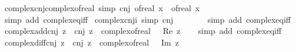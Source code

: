 \begin{isabellebody}
\endisatagproof
{\isafoldproof}%
%
\isadelimproof
\isanewline
%
\endisadelimproof
\isanewline
{}\isamarkupfalse%
\ complex{\isacharunderscore}{\kern0pt}cnj{\isacharunderscore}{\kern0pt}complex{\isacharunderscore}{\kern0pt}of{\isacharunderscore}{\kern0pt}real\ {\isacharbrackleft}{\kern0pt}simp{\isacharbrackright}{\kern0pt}{\isacharcolon}{\kern0pt}\ {\isachardoublequoteopen}cnj\ {\isacharparenleft}{\kern0pt}of{\isacharunderscore}{\kern0pt}real\ x{\isacharparenright}{\kern0pt}\ {\isacharequal}{\kern0pt}\ of{\isacharunderscore}{\kern0pt}real\ x{\isachardoublequoteclose}\isanewline
%
\isadelimproof
\ \ %
\endisadelimproof
%
\isatagproof
{}\isamarkupfalse%
\ {\isacharparenleft}{\kern0pt}simp\ add{\isacharcolon}{\kern0pt}\ complex{\isacharunderscore}{\kern0pt}eq{\isacharunderscore}{\kern0pt}iff{\isacharparenright}{\kern0pt}%
\endisatagproof
{\isafoldproof}%
%
\isadelimproof
\isanewline
%
\endisadelimproof
\isanewline
{}\isamarkupfalse%
\ complex{\isacharunderscore}{\kern0pt}cnj{\isacharunderscore}{\kern0pt}i\ {\isacharbrackleft}{\kern0pt}simp{\isacharbrackright}{\kern0pt}{\isacharcolon}{\kern0pt}\ {\isachardoublequoteopen}cnj\ {\isasymi}\ {\isacharequal}{\kern0pt}\ {\isacharminus}{\kern0pt}\ {\isasymi}{\isachardoublequoteclose}\isanewline
%
\isadelimproof
\ \ %
\endisadelimproof
%
\isatagproof
{}\isamarkupfalse%
\ {\isacharparenleft}{\kern0pt}simp\ add{\isacharcolon}{\kern0pt}\ complex{\isacharunderscore}{\kern0pt}eq{\isacharunderscore}{\kern0pt}iff{\isacharparenright}{\kern0pt}%
\endisatagproof
{\isafoldproof}%
%
\isadelimproof
\isanewline
%
\endisadelimproof
\isanewline
{}\isamarkupfalse%
\ complex{\isacharunderscore}{\kern0pt}add{\isacharunderscore}{\kern0pt}cnj{\isacharcolon}{\kern0pt}\ {\isachardoublequoteopen}z\ {\isacharplus}{\kern0pt}\ cnj\ z\ {\isacharequal}{\kern0pt}\ complex{\isacharunderscore}{\kern0pt}of{\isacharunderscore}{\kern0pt}real\ {\isacharparenleft}{\kern0pt}{}\ {\isacharasterisk}{\kern0pt}\ Re\ z{\isacharparenright}{\kern0pt}{\isachardoublequoteclose}\isanewline
%
\isadelimproof
\ \ %
\endisadelimproof
%
\isatagproof
{}\isamarkupfalse%
\ {\isacharparenleft}{\kern0pt}simp\ add{\isacharcolon}{\kern0pt}\ complex{\isacharunderscore}{\kern0pt}eq{\isacharunderscore}{\kern0pt}iff{\isacharparenright}{\kern0pt}%
\endisatagproof
{\isafoldproof}%
%
\isadelimproof
\isanewline
%
\endisadelimproof
\isanewline
{}\isamarkupfalse%
\ complex{\isacharunderscore}{\kern0pt}diff{\isacharunderscore}{\kern0pt}cnj{\isacharcolon}{\kern0pt}\ {\isachardoublequoteopen}z\ {\isacharminus}{\kern0pt}\ cnj\ z\ {\isacharequal}{\kern0pt}\ complex{\isacharunderscore}{\kern0pt}of{\isacharunderscore}{\kern0pt}real\ {\isacharparenleft}{\kern0pt}{}\ {\isacharasterisk}{\kern0pt}\ Im\ z{\isacharparenright}{\kern0pt}\ {\isacharasterisk}{\kern0pt}\ {\isasymi}{\isachardoublequoteclose}\isanewline

\end{isabellebody}
